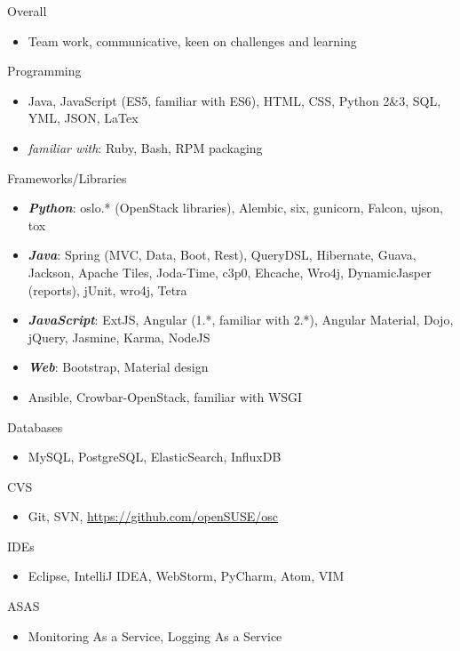 
\begin{cvskills}

    \cvskill
    {Overall}
    {
      \begin{itemize}[label={}]
        \item Team work, communicative, keen on challenges and learning
      \end{itemize}
    }

    \cvskill
    {Programming}
    {
      \begin{itemize}[label={}]
        \item Java, JavaScript (ES5, familiar with ES6), HTML, CSS, Python 2\&3,
          SQL, YML, JSON, LaTex
        \item \textit{familiar with}: Ruby, Bash, RPM packaging
      \end{itemize}
    }

    \cvskill
    {Frameworks/Libraries}
    {
      \begin{itemize}[label={}]
        \item \textit{\textbf{Python}}: oslo.* (OpenStack libraries), Alembic, six,
          gunicorn, Falcon, ujson, tox
        \item \textit{\textbf{Java}}: Spring (MVC, Data, Boot, Rest), QueryDSL, Hibernate,\linebreak
          Guava, Jackson, Apache Tiles, Joda-Time, c3p0, Ehcache, Wro4j,
          DynamicJasper (reports), jUnit, wro4j, Tetra
        \item \textit{\textbf{JavaScript}}: ExtJS, Angular (1.*, familiar with 2.*),
          Angular Material, Dojo, jQuery, Jasmine, Karma, NodeJS
        \item \textit{\textbf{Web}}: Bootstrap, Material design
        \item Ansible, Crowbar-OpenStack, familiar with WSGI
      \end{itemize}
    }

    \cvskill
    {Databases}
    {
      \begin{itemize}[label={}]
        \item MySQL, PostgreSQL, ElasticSearch, InfluxDB
      \end{itemize}
    }

    \cvskill
    {CVS}
    {
      \begin{itemize}[label={}]
        \item Git, SVN, \href{OSC}{https://github.com/openSUSE/osc}
      \end{itemize}
    }

    \cvskill
    {IDEs}
    {
      \begin{itemize}[label={}]
        \item Eclipse, IntelliJ IDEA, WebStorm, PyCharm, Atom, VIM
      \end{itemize}
    }

    \cvskill
    {ASAS}
    {
      \begin{itemize}[label={}]
        \item Monitoring As a Service, Logging As a Service
      \end{itemize}
    }

\end{cvskills}
